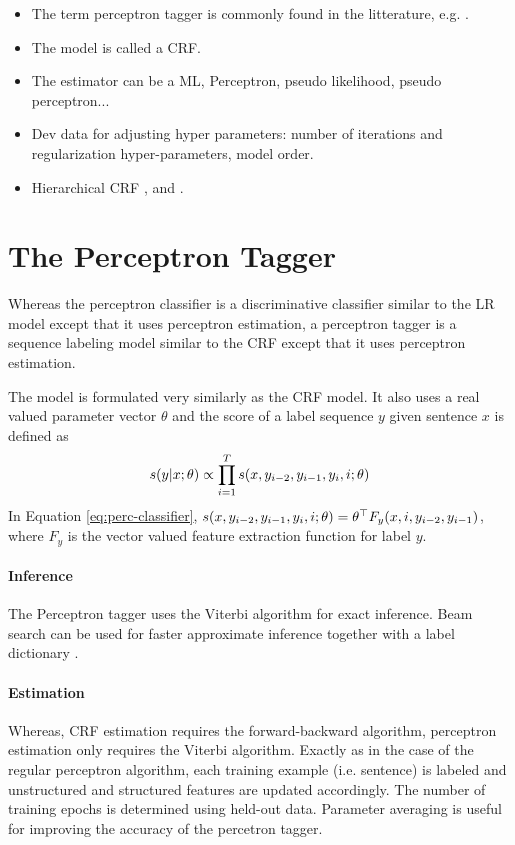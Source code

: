 \begin{itemize}
\item The term perceptron tagger is commonly found in the litterature, e.g. \cite{Collins2002}.
\item The model is called a CRF.
\item The estimator can be a ML, Perceptron, pseudo likelihood, pseudo
  perceptron...
\item Dev data for adjusting hyper parameters: number of iterations and
  regularization hyper-parameters, model order.
\item Hierarchical CRF \cite{Muller2013}, \cite{Weiss2010} and \cite{Charniak2005}.
\end{itemize}

\section{The Perceptron Tagger}

Whereas the perceptron classifier is a discriminative classifier
similar to the LR model except that it uses perceptron estimation, a
perceptron tagger \citep{Collins2002} is a sequence labeling model
similar to the CRF except that it uses perceptron estimation.

The model is formulated very similarly as the CRF model. It also uses
a real valued parameter vector $\theta$ and the score of a label
sequence $y$ given sentence $x$ is defined as
\begin{equation}s(y|x\mbox{$ ; \, $}\theta) \propto \prod_{i = 1}^T s(x,
  y_{i-2}, y_{i-1}, y_i, i\mbox{$ ; \, $}
  \theta)\label{eq:perc-classifier}\end{equation} In Equation
\ref{eq:perc-classifier}, $s(x, y_{i-2}, y_{i-1}, y_i, i\mbox{$ ; \, $}
\theta) = \theta^\top F_y(x, i, y_{i-2}, y_{i-1})$, where $F_y$ is the
vector valued feature extraction function for label $y$.

\paragraph{Inference} The Perceptron tagger uses the Viterbi algorithm
for exact inference. Beam search can be used for faster approximate
inference together with a label dictionary \citep{Silfverberg2015}.

\paragraph{Estimation}Whereas, CRF estimation requires the
forward-backward algorithm, perceptron estimation only requires the
Viterbi algorithm.  Exactly as in the case of the regular perceptron
algorithm, each training example (i.e. sentence) is labeled and
unstructured and structured features are updated accordingly. The
number of training epochs is determined using held-out data. Parameter
averaging is useful for improving the accuracy of the percetron
tagger.

